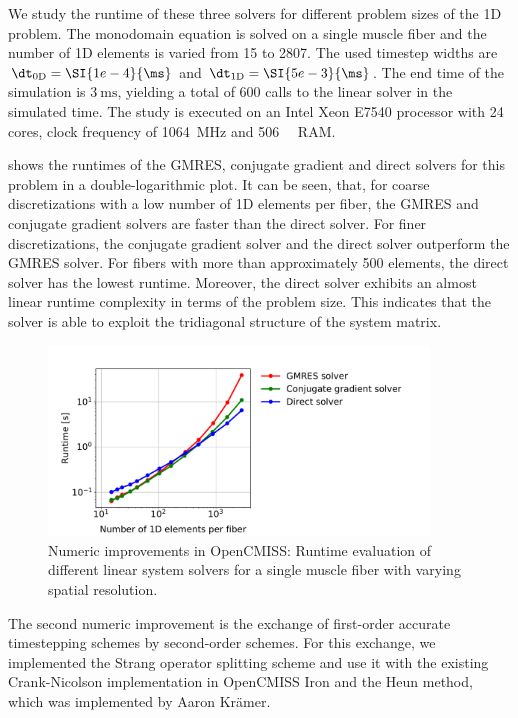 We study the runtime of these three solvers for different problem sizes of the 1D problem. The monodomain equation is solved on a single muscle fiber and the number of 1D elements is varied from 15 to 2807. The used timestep widths are $\dt_\text{0D}=\SI{1e-4}{\ms}$ and $\dt_\text{1D}=\SI{5e-3}{\ms}$. The end time of the simulation is $\SI{3}{\ms}$, yielding a total of 600 calls to the linear solver in the simulated time. The study is executed on an Intel Xeon E7540 processor with 24 cores, clock frequency of \SI{1064}{\mega\hertz} and \SI{506}{\gibi\byte} RAM.

 shows the runtimes of the GMRES, conjugate gradient and direct solvers for this problem in a double-logarithmic plot.
It can be seen, that, for coarse discretizations with a low number of 1D elements per fiber, the GMRES and conjugate gradient solvers are faster than the direct solver. For finer discretizations, the conjugate gradient solver and the direct solver outperform the GMRES solver. For fibers with more than approximately 500 elements, the direct solver has the lowest runtime. Moreover, the direct solver exhibits an almost linear runtime complexity in terms of the problem size. This indicates that the solver is able to exploit the tridiagonal structure of the system matrix.

\begin{figure}
  \centering%
  \includegraphics[width=0.9\textwidth]{images/results/studies/opencmiss_linear_solvers.pdf}%
  \caption{Numeric improvements in OpenCMISS: Runtime evaluation of different linear system solvers for a single muscle fiber with varying spatial resolution.}%
  \label{fig:opencmiss_linear_solvers}%
\end{figure}%

The second numeric improvement is the exchange of first-order accurate timestepping schemes by second-order schemes. For this exchange, we implemented the Strang operator splitting scheme and use it with the existing Crank-Nicolson implementation in OpenCMISS Iron and the Heun method, which was  implemented by Aaron Krämer.

